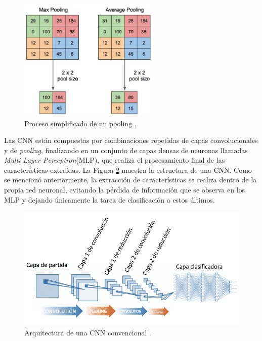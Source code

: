 \begin{figure}[h!] 
    \includegraphics[width=0.6\textwidth]{images/pooling.png} 
    \centering 
    \caption{Proceso simplificado de un pooling \protect\cite{pooling}.} 
    \label{pooling} 
\end{figure}

Las CNN están compuestas por combinaciones repetidas de capas
convolucionales y de \textit{pooling}, finalizando en un conjunto 
de capas densas de neuronas llamadas \textit{Multi Layer 
Perceptron}(MLP), que realiza el procesamiento final de las 
características extraídas. La Figura \ref{CNN} muestra la 
estructura de una CNN. Como se mencionó anteriormente, 
la extracción de características se realiza dentro de la 
propia red neuronal, evitando la pérdida de información que 
se observa en los MLP y dejando únicamente la tarea de 
clasificación a estos últimos.

\begin{figure}[h!] 
    \includegraphics[width=1\textwidth]{images/CNN.png} 
    \centering 
    \caption{Arquitectura de una CNN convencional \protect\cite{CNN-Arquitectura}.} 
    \label{CNN} 
\end{figure}

